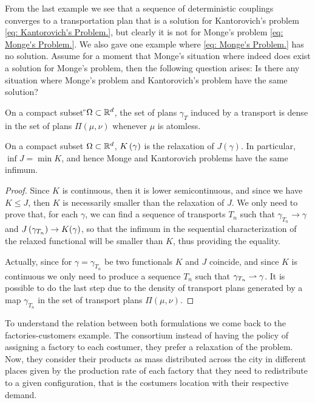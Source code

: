 From the last example we see that a sequence of deterministic couplings converges to a transportation plan that is a solution for Kantorovich's problem \eqref{eq: Kantorovich's Problem.}, but clearly it is not for Monge's problem \eqref{eq: Monge's Problem.}. We also gave one example where \eqref{eq: Monge's Problem.} has no solution. Assume for a moment that Monge's  situation where indeed does exist a solution for Monge's problem, then the following question arises: Is there any situation where Monge's problem and Kantorovich's problem have the same solution?

\begin{lemma}
On a compact subset  ̋$\Omega \subset \mathbb{R}^d$, the set of plans $\gamma_T$ induced by a transport is dense in the set of plans $\Pi(\mu, \nu) $ whenever $\mu$ is atomless.
\end{lemma}

\begin{theorem}
On a compact subset $\Omega \subset \mathbb{R}^d$,  $K\left(\gamma\right)$ is the relaxation of $J(\gamma)$. In particular, $\inf J = \min K$, and hence Monge and Kantorovich problems have the same infimum.
\end{theorem}
\begin{proof}
Since $K$ is continuous, then it is lower semicontinuous, and since we have $K\leq J$, then $K$ is necessarily smaller than the relaxation of $J$. We only need to prove that, for each $\gamma$, we can find a sequence of transports $T_n$ such that $\gamma_{T_n}\rightarrow \gamma$ and $J\left( \gamma_{T_n} \right)\rightarrow K(\gamma)$, so that the infimum in the sequential characterization of the relaxed functional will be smaller than $K$, thus providing the equality. 

Actually, since for $\gamma=\gamma_{T_n}$ be two functionals $K$ and $J$ coincide, and since $K$ is continuous we only need to produce a sequence $T_n$ such that $\gamma_{T_n}\rightharpoonup\gamma$. It is possible to do the last step due to the density of transport plans generated by a map $\gamma_{T_n}$ in the set of transport plans $\Pi(\mu, \nu)$.
\end{proof}

To understand the relation between both formulations we come back to the factories-customers example. The consortium instead of having the policy of assigning a factory to each costumer, they prefer a relaxation of the problem. Now, they consider their products as mass distributed across the city in different places given by the production rate of each factory that they need to redistribute to a given configuration, that is the costumers location with their respective demand. 


